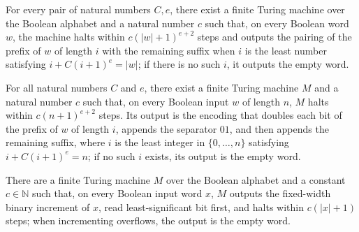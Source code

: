 \begin{lemma}
\label{Turing.FinTM.splitSolve_closed}
\leanok
{}
For every pair of natural numbers $C,e$, there exist a finite Turing machine over the
Boolean alphabet and a natural number $c$ such that, on every Boolean word $w$, the
machine halts within $c(|w|+1)^{e+2}$ steps and outputs the pairing of the prefix of $w$
of length $i$ with the remaining suffix when $i$ is the least number satisfying
$i+C(i+1)^e=|w|$; if there is no such $i$, it outputs the empty word.
\end{lemma}

\begin{theorem}
\label{Turing.FinTM.computesFunInTime_splitSolve}
\leanok
{}
For all natural numbers $C$ and $e$, there exist a finite Turing machine $M$ and a
natural number $c$ such that, on every Boolean input $w$ of length $n$, $M$ halts within
$c(n+1)^{e+2}$ steps. Its output is the encoding that doubles each bit of the prefix of
$w$ of length $i$, appends the separator $01$, and then appends the remaining suffix,
where $i$ is the least integer in $\{0,\ldots,n\}$ satisfying $i+C(i+1)^e=n$; if no such
$i$ exists, its output is the empty word.
\end{theorem}

\begin{theorem}
\label{Turing.FinTM.computesFunInTime_incFixed}
\leanok
{}
There are a finite Turing machine $M$ over the Boolean alphabet and a constant
$c\in\mathbb{N}$ such that, on every Boolean input word $x$, $M$ outputs the fixed-width
binary increment of $x$, read least-significant bit first, and halts within $c(|x|+1)$
steps; when incrementing overflows, the output is the empty word.
\end{theorem}


